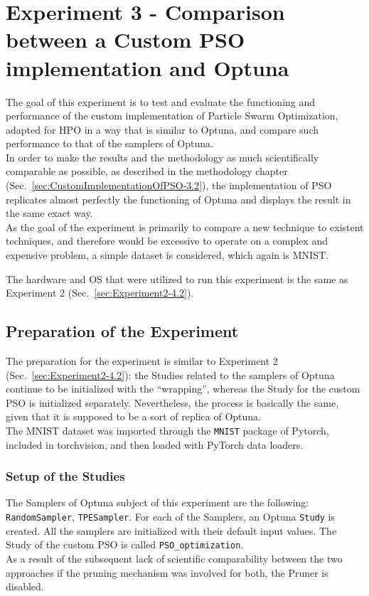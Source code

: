 \section[Experiment 3 - Comparison: Custom PSO vs Optuna]{Experiment 3 - Comparison between a Custom PSO implementation and Optuna}

The goal of this experiment is to test and evaluate the functioning and performance of the custom implementation of Particle Swarm Optimization, adapted for HPO in a way that is similar to Optuna, and compare such performance to that of the samplers of Optuna.
\\[0.3cm]In order to make the results and the methodology as much scientifically comparable as possible, as described in the methodology chapter (Sec.~\ref{sec:CustomImplementationOfPSO-3.2}), the implementation of PSO replicates almost perfectly the functioning of Optuna and displays the result in the same exact way.
\\[0.3cm]As the goal of the experiment is primarily to compare a new technique to existent techniques, and therefore would be excessive to operate on a complex and expensive problem, a simple dataset is considered, which again is MNIST.

The hardware and OS that were utilized to run this experiment is the same as Experiment 2 (Sec.~\ref{sec:Experiment2-4.2}).

\subsection{Preparation of the Experiment}

The preparation for the experiment is similar to Experiment 2 (Sec.~\ref{sec:Experiment2-4.2}): the Studies related to the samplers of Optuna continue to be initialized with the “wrapping”, whereas the Study for the custom PSO is initialized separately. Nevertheless, the process is basically the same, given that it is supposed to be a sort of replica of Optuna. 
\\[0.3cm]The MNIST dataset was imported through the \texttt{MNIST} package of Pytorch, included in torchvision, and then loaded with PyTorch data loaders.

\subsubsection{Setup of the Studies}

The Samplers of Optuna subject of this experiment are the following: \texttt{RandomSampler}, \texttt{TPESampler}.
For each of the Samplers, an Optuna \texttt{Study} is created. All the samplers are initialized with their default input values.
The Study of the custom PSO is called \texttt{PSO\_optimization}.
\\[0.3cm]As a result of the subsequent lack of scientific comparability between the two approaches if the pruning mechanism was involved for both, the Pruner is disabled.

